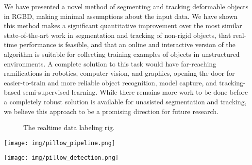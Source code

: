 \documentclass[journal]{IEEEtran}
\begin{document}
We have presented a novel method of segmenting and tracking deformable objects in RGBD, making minimal assumptions about the input data.  We have shown this method makes a significant quantitative improvement over the most similar state-of-the-art work in segmentation and tracking of non-rigid objects, that real-time performance is feasible, and that an online and interactive version of the algorithm is suitable for collecting training examples of objects in unstructured environments.  A complete solution to this task would have far-reaching ramifications in robotics, computer vision, and graphics, opening the door for easier-to-train and more reliable object recognition, model capture, and tracking-based semi-supervised learning.  While there remains more work to be done before a completely robust solution is available for unasisted segmentation and tracking, we believe this approach to be a promising direction for future research.




\begin{figure}
  \centering
  \caption{The realtime data labeling rig.}
  \label{fig:rig}
\end{figure}

\begin{figure*}
\centering
        \texttt{[image: img/pillow\_pipeline.png]}
\caption{\small{Example data labeling pipeline demonstrating one possible application of the presented algorithm.  Segmented objects are obtained while the raw data is being recorded.  Segmentation hints from the user generate node potentials in the CRF so the user can direct the segmentation at any time; without input, the segmenter makes use of only the other cues discussed in Section~\ref{sec:energy} to produce segmentation masks. The output is a set of segmented object examples suitable for training standard object detectors. }}
\label{fig:data_labeling}
\end{figure*}

\begin{figure*}
\centering
        \texttt{[image: img/pillow\_detection.png]}
\caption{\small{Object detection example trained using the method in Figure~\ref{fig:data_labeling}. Color and depth templates are extracted from pillow examples collected using the presented algorithm.  An appropriate object detection method (LINE-MOD in our example) searches for the templates in previously-unseen test frames and identifies ``detections'' as matches with responses exceeding a threshold.}}
\label{fig:object_rec}
\end{figure*}
\end{document}
